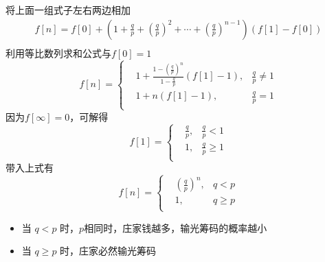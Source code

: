 \documentclass[
]{article}
\begin{document}
将上面一组式子左右两边相加\\
\begin{equation}
\begin{aligned}
f[n] = f[0]+(1 + \frac{q}{p} +  (\frac{q}{p})^{2} + \cdots +(\frac{q}{p})^{n-1})(f[1] - f[0])\\
\end{aligned}
\end{equation}
利用等比数列求和公式与$f[0]=1$\\
\begin{equation}
f[n] =\left\{
\begin{aligned}
&1+\frac{1-(\frac{q}{p})^n}{1-\frac{q}{p}}(f[1] - 1), &\frac{q}{p} \neq 1 \\
&1+n(f[1]-1), &\frac{q}{p} = 1 \\
\end{aligned}
\right.
\end{equation}
因为$f[\infty]=0$，可解得\\
\begin{equation}
f[1] =\left\{
\begin{aligned}
&\frac{q}{p}, &\frac{q}{p} < 1 \\
&1, &\frac{q}{p} \geq 1 \\
\end{aligned}
\right.
\end{equation}
带入上式有\\
\begin{equation}
f[n] =\left\{
\begin{aligned}
&(\frac{q}{p})^n, & q<p\\
&1, & q \geq p \\
\end{aligned}
\right.
\end{equation}
\begin{itemize}
\item
  当 $q < p$ 时，$p$相同时，庄家钱越多，输光筹码的概率越小
\item
  当 $q \geq p$ 时，庄家必然输光筹码
\end{itemize}
\end{document}
